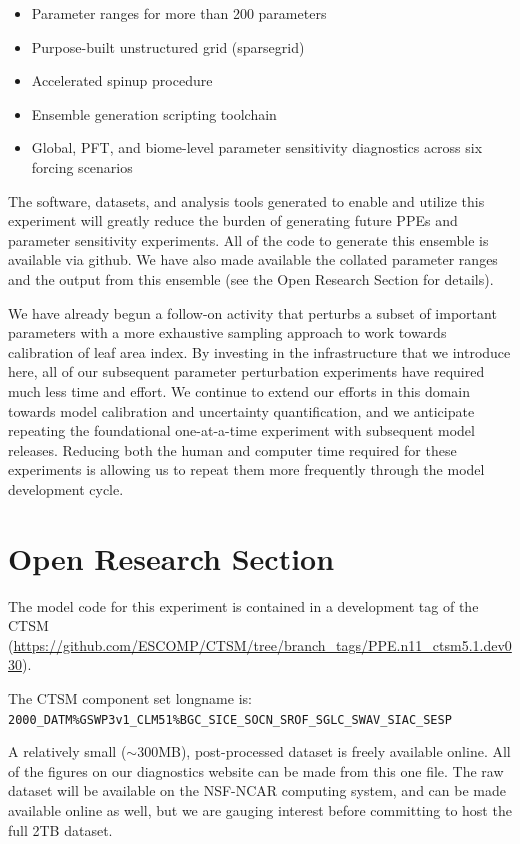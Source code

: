 \documentclass[draft]{agujournal2019}
\begin{document}
\begin{itemize}
\item Parameter ranges for more than 200 parameters
\item Purpose-built unstructured grid (sparsegrid)
\item Accelerated spinup procedure
\item Ensemble generation scripting toolchain
\item Global, PFT, and biome-level parameter sensitivity diagnostics across six forcing scenarios
\end{itemize} 

The software, datasets, and analysis tools generated to enable and utilize this experiment will greatly reduce the burden of generating future PPEs and parameter sensitivity experiments.
All of the code to generate this ensemble is available via github. We have also made available the collated parameter ranges and the output from this ensemble (see the Open Research Section for details).

We have already begun a follow-on activity that perturbs a subset of important parameters with a more exhaustive sampling approach to work towards calibration of leaf area index. By investing in the infrastructure that we introduce here, all of our subsequent parameter perturbation experiments have required much less time and effort. We continue to extend our efforts in this domain towards model calibration and uncertainty quantification, and we anticipate repeating the foundational one-at-a-time experiment with subsequent model releases. Reducing both the human and computer time required for these experiments is allowing us to repeat them more frequently through the model development cycle.

\section*{Open Research Section}

The model code for this experiment is contained in a development tag of the CTSM (\url{https://github.com/ESCOMP/CTSM/tree/branch_tags/PPE.n11_ctsm5.1.dev030}).

The CTSM component set longname is: \\ \texttt{2000\_DATM\%GSWP3v1\_CLM51\%BGC\_SICE\_SOCN\_SROF\_SGLC\_SWAV\_SIAC\_SESP}

A relatively small ($\sim$300MB), post-processed dataset is freely available online. All of the figures on our diagnostics website can be made from this one file. The raw dataset will be available on the NSF-NCAR computing system, and can be made available online as well, but we are gauging interest before committing to host the full 2TB dataset.
\end{document}
